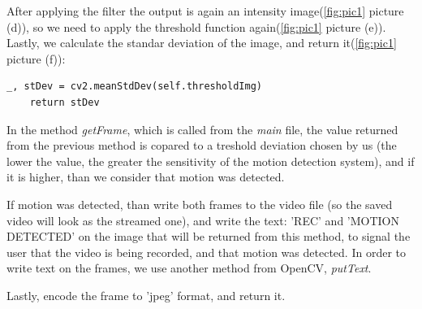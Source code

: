 \documentclass[a4paper,12pt]{report}
\begin{document}
After applying the filter the output is again an intensity image(\ref{fig:pic1} picture (d)), so we need to apply the threshold function again(\ref{fig:pic1} picture (e)). Lastly, we calculate the standar deviation of the image, and return it(\ref{fig:pic1} picture (f)):

\begin{Verbatim}[frame=single]
    _, stDev = cv2.meanStdDev(self.thresholdImg)
    return stDev
\end{Verbatim}

In the method \textit{getFrame}, which is called from the \textit{main} file, the value returned from the previous method is copared to a treshold deviation chosen by us (the lower the value, the greater the sensitivity of the motion detection system), and if it is higher, than we consider that motion was detected. 

If motion was detected, than write both frames to the video file (so the saved video will look as the streamed one), and write the text: 'REC' and 'MOTION DETECTED' on the image that will be returned from this method, to signal the user that the video is being recorded, and that motion was detected. In order to write text on the frames, we use another method from OpenCV, \textit{putText}.

Lastly, encode the frame to 'jpeg' format, and return it.
\end{document}
